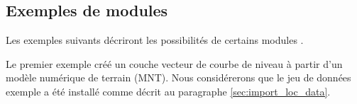 {%
\subsection{Exemples de modules \grass }
Les exemples suivants décriront les possibilités de certains modules \grass.


Le premier exemple créé un couche vecteur de courbe de niveau à partir d'un modèle numérique de terrain (MNT). Nous considérerons que le jeu de données exemple  a été installé comme décrit au paragraphe \ref{sec:import_loc_data}.

}
